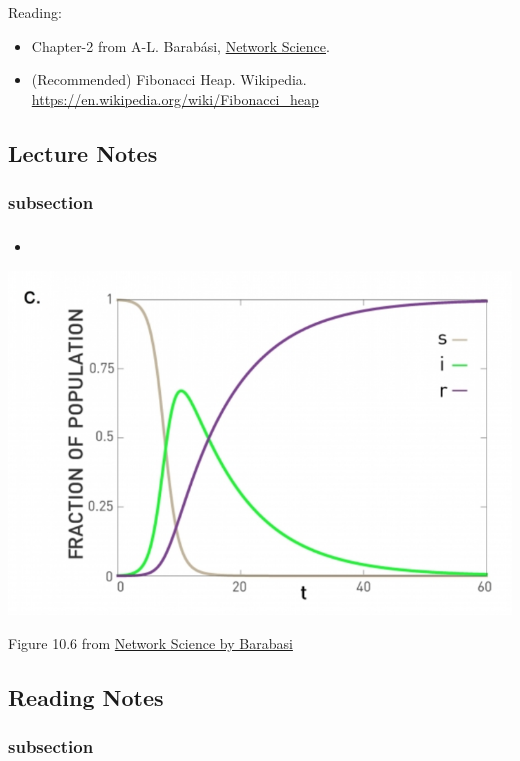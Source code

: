 \documentclass[11pt]{scrartcl} %
\begin{document}
Reading:
\begin{itemize}
	\item Chapter-2 from A-L. Barabási, \href{http://networksciencebook.com/}{Network Science}.
	\item (Recommended) Fibonacci Heap. Wikipedia. \url{https://en.wikipedia.org/wiki/Fibonacci\_heap}
\end{itemize}

\subsection{Lecture Notes}

\subsubsection{subsection}

\subsubsection{}

\paragraph{}

\textbf{}

\begin{itemize}
	\item 
\end{itemize}

\begin{center}
\includegraphics[width=0.75\linewidth]{img/L9.3_SIRmodel.png}

{\tiny Figure 10.6 from \href{http://networksciencebook.com/}{Network Science by Barabasi}}
\end{center}

\subsection{Reading Notes}

\subsubsection{subsection}
\textbf{}

\end{document}
